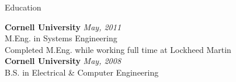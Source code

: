 \documentclass{resume} %
\begin{document}

\begin{rSection}{Education}

{\bf Cornell University} \hfill {\em May, 2011} \\ 
M.Eng. in Systems Engineering \\
Completed M.Eng. while working full time at Lockheed Martin \\

{\bf Cornell University} \hfill {\em May, 2008} \\ 
B.S. in Electrical \& Computer Engineering \\
\end{rSection}

\end{document}

